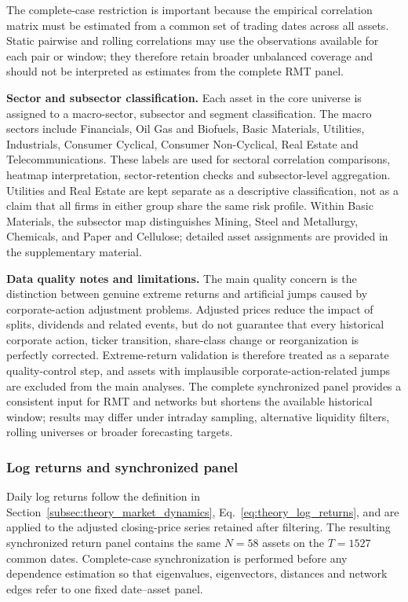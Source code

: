 The complete-case restriction is important because the empirical correlation matrix must be estimated from a common set of trading dates across all assets. Static pairwise and rolling correlations may use the observations available for each pair or window; they therefore retain broader unbalanced coverage and should not be interpreted as estimates from the complete RMT panel.

\noindent\textbf{Sector and subsector classification.} Each asset in the core universe is assigned to a macro-sector, subsector and segment classification. The macro sectors include Financials, Oil Gas and Biofuels, Basic Materials, Utilities, Industrials, Consumer Cyclical, Consumer Non-Cyclical, Real Estate and Telecommunications. These labels are used for sectoral correlation comparisons, heatmap interpretation, sector-retention checks and subsector-level aggregation. Utilities and Real Estate are kept separate as a descriptive classification, not as a claim that all firms in either group share the same risk profile. Within Basic Materials, the subsector map distinguishes Mining, Steel and Metallurgy, Chemicals, and Paper and Cellulose; detailed asset assignments are provided in the supplementary material.

\noindent\textbf{Data quality notes and limitations.} The main quality concern is the distinction between genuine extreme returns and artificial jumps caused by corporate-action adjustment problems. Adjusted prices reduce the impact of splits, dividends and related events, but do not guarantee that every historical corporate action, ticker transition, share-class change or reorganization is perfectly corrected. Extreme-return validation is therefore treated as a separate quality-control step, and assets with implausible corporate-action-related jumps are excluded from the main analyses. The complete synchronized panel provides a consistent input for RMT and networks but shortens the available historical window; results may differ under intraday sampling, alternative liquidity filters, rolling universes or broader forecasting targets.

\subsubsection{Log returns and synchronized panel}
\label{subsec:notation}

Daily log returns follow the definition in Section~\ref{subsec:theory_market_dynamics}, Eq.~\eqref{eq:theory_log_returns}, and are applied to the adjusted closing-price series retained after filtering. The resulting synchronized return panel contains the same $N=58$ assets on the $T=1527$ common dates. Complete-case synchronization is performed before any dependence estimation so that eigenvalues, eigenvectors, distances and network edges refer to one fixed date--asset panel.

